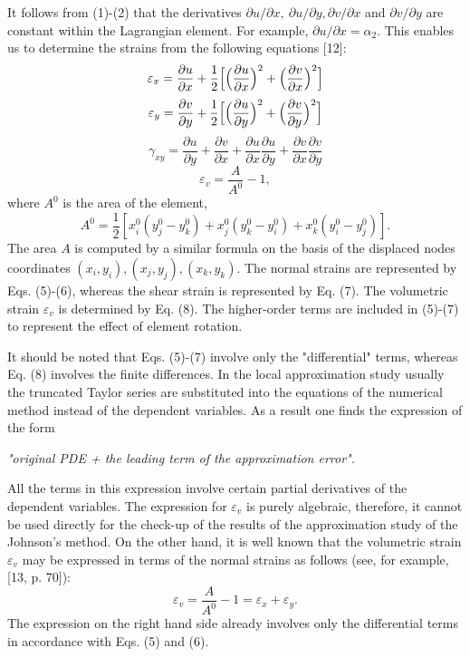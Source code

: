     It follows from (1)-(2) that the derivatives $\partial u/\partial x,
~\partial u/\partial y,\partial v/\partial x$ and $\partial v/\partial y$
are constant within the Lagrangian element. For example,
$\partial u/\partial x= \alpha_2$. This enables us to determine the strains
from the following equations [12]:
\begin{equation}
\varepsilon_x = \frac{\partial u}{\partial x} + \frac{1}{2}\Bigl[\Bigl(
\frac{\partial u}{\partial x}\Bigr)^2 +\Bigl(\frac{\partial v}{\partial x}
\Bigr)^2\Bigr]
\end{equation}
\begin{equation}
\varepsilon_y = \frac{\partial v}{\partial y} + \frac{1}{2}\Bigl[\Bigl(
\frac{\partial u}{\partial y}\Bigr)^2 +\Bigl(\frac{\partial v}{\partial y}
\Bigr)^2\Bigr]
\end{equation}
\begin{equation}
\gamma_{xy}=\frac{\partial u}{\partial y} + \frac{\partial v}{\partial x}
+ \frac{\partial u}{\partial x}\frac{\partial u}{\partial y}
+ \frac{\partial v}{\partial x}\frac{\partial v}{\partial y}
\end{equation}
\begin{equation}
\varepsilon_v = \frac{A}{A^0} - 1,
\end{equation}
where $A^0$ is the area of the element,
\begin{equation}
A^0=\frac{1}{2}[x_i^0(y_j^0-y_k^0)+x_j^0(y_k^0-y_i^0)+x_k^0(y_i^0-y_j^0)].
\end{equation}
The area $A$ is computed by a similar formula on the basis of the displaced
nodes coordinates $(x_i,y_i),(x_j,y_j),(x_k,y_k)$.
The normal strains are represented by Eqs. (5)-(6), whereas the shear strain
is represented by Eq. (7). The volumetric strain $\varepsilon_v$ is
determined by Eq. (8). The higher-order terms are included in (5)-(7) to
represent the effect of element rotation.

   It should be noted that Eqs. (5)-(7) involve only the "differential"
terms, whereas Eq. (8) involves the finite differences. In the local
approximation study usually the truncated Taylor series are substituted into
the equations of the numerical method instead of the dependent variables. As
a result one finds the expression of the form
\begin{center}
{\em "original PDE + the leading term of the approximation error".}
\end{center}
All the terms in this expression involve certain partial derivatives of the
dependent variables. The expression for $\varepsilon_v$ is purely algebraic,
therefore, it cannot be used directly for the check-up of the results of the
approximation study of the Johnson's method. On the other hand, it is well
known that the volumetric strain $\varepsilon_v$ may be expressed in terms of
the normal strains as follows (see, for example, [13, p. 70]):
\begin{equation}
\varepsilon_v = \frac{A}{A^0} - 1 = \varepsilon_x +\varepsilon_y.
\end{equation}
The expression on the right hand side already involves only the differential
terms in accordance with Eqs. (5) and (6).

